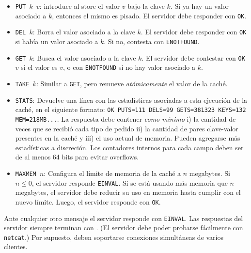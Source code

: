 \documentclass[tp]{lcc}
\begin{document}
\begin{itemize}
    \item \texttt{PUT $k$ $v$}: introduce al store el valor $v$ bajo
        la clave $k$. Si ya hay un valor asociado a 
        $k$, entonces el mismo es pisado. 
        El servidor debe responder con \texttt{OK}.

    \item \texttt{DEL $k$}:
        Borra el valor asociado a la clave $k$.
        El servidor debe responder con \texttt{OK} si había un
        valor asociado a $k$. Si no, contesta con \texttt{ENOTFOUND}.

    \item \texttt{GET $k$}:
        Busca el valor asociado a la clave $k$.
        El servidor debe contestar con \texttt{OK $v$} si
        el valor es $v$, o con \texttt{ENOTFOUND} si no hay
        valor asociado a $k$.

    \item \texttt{TAKE $k$}:
        Similar a \texttt{GET}, pero remueve \emph{atómicamente} el
        valor de la caché.

    \item \texttt{STATS}:
        Devuelve una línea con las estadísticas asociadas
        a esta ejecución de la caché, en el siguiente formato:
        \texttt{OK PUTS=111 DELS=99 GETS=381323 KEYS=132 MEM=218MB...}. 
        La respuesta debe contener \emph{como mínimo} i) la cantidad
        de veces que se recibió cada tipo de pedido ii) la cantidad
        de pares clave-valor presentes en la caché y iii) el uso actual
        de memoria.
        Pueden agregarse más estadísticas a discreción.
        Los contadores internos para cada campo deben ser de al menos 64
        bits para evitar overflows.

    \item \texttt{MAXMEM $n$}:
        Configura el límite de memoria de la caché a $n$ megabytes.
        Si $n \le 0$, el servidor responde \texttt{EINVAL}.
        Si se está usando más memoria que $n$ megabytes, el servidor debe reducir
        su uso en memoria hasta cumplir con el nuevo límite.
        Luego, el servidor responde con \texttt{OK}.
\end{itemize}

Ante cualquier otro mensaje el servidor responde con
\texttt{EINVAL}.
%
Las respuestas del servidor siempre terminan con . (El
servidor debe poder probarse fácilmente con \texttt{netcat}.) Por
supuesto, deben soportarse conexiones simultáneas de varios
clientes.
\end{document}
